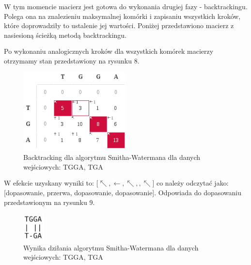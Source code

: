 \documentclass[a4paper,12pt]{article}
\begin{document}
W tym momencie macierz jest gotowa do wykonania drugiej fazy - backtrackingu. Polega ona na znalezieniu maksymalnej komórki i zapisaniu wszystkich kroków, które doprowadziły to ustalenie jej wartości. Poniżej przedstawiono macierz z nasiesioną ścieżką metodą backtrackingu. 

Po wykonaniu analogicznych kroków dla wszystkich komórek macierzy otrzymamy stan przedstawiony na rysunku 8.
\begin{figure}[h]
  \vspace{5pt}
  \centering
  \begin{center}
  \includegraphics[width=0.5\textwidth]{images/SchematDzialaniaAlgorytmuPelnaMacierzBacktracking.png}
  \end{center}
  \caption{Backtracking dla algorytmu Smitha-Watermana dla danych wejściowych: TGGA, TGA}
 \end{figure}

W efekcie uzyskany wyniki to: [$\nwarrow, \leftarrow, \nwarrow, , \nwarrow$] co należy odczytać jako: [dopasowanie, przerwa, dopasowanie, dopasowanie]. 
Odpowiada do dopasowaniu przedstawionym na rysunku 9. 
\begin{figure}[h]
  \vspace{5pt}
  \centering
  \begin{center}
  \includegraphics[width=0.1\textwidth]{images/uzyskaneDopasowanie.png}
  \end{center}
  \caption{Wynika dziłania algorytmu Smitha-Watermana dla danych wejściowych: TGGA, TGA}
 \end{figure}
\end{document}

